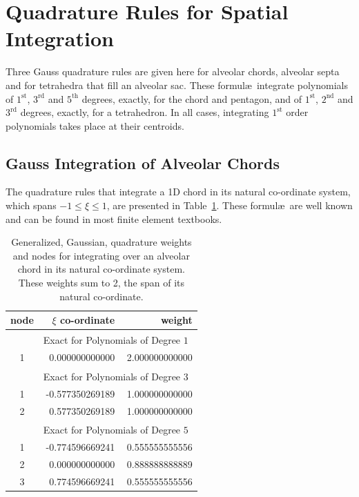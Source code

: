 \section{Quadrature Rules for Spatial Integration}
\label{secGauss}

Three Gauss quadrature rules are given here for alveolar chords, alveolar septa and for tetrahedra that fill an alveolar sac.  These formul\ae\ integrate polynomials of $1^{\text{st}}$, $3^{\text{rd}}$ and $5^{\text{th}}$ degrees, exactly, for the chord and pentagon, and of $1^{\text{st}}$, $2^{\text{nd}}$ and $3^{\text{rd}}$ degrees, exactly, for a tetrahedron.  In all cases, integrating $1^{\text{st}}$ order polynomials takes place at their centroids.

\subsection{Gauss Integration of Alveolar Chords}

The quadrature rules that integrate a 1D chord in its natural co-ordinate system, which spans $-1 \leq \xi \leq 1$, are presented in Table~\ref{tabQuadrature1D}.  These formul\ae\ are well known and can be found in most finite element textbooks.

\begin{table}
    \centering
    \begin{tabular}{|c|rr|}
        \hline
        node & \centering $\xi$ co-ordinate \phantom{1}  & 
        weight \phantom{123} \\ \hline
        & \multicolumn{2}{|c|}{Exact for Polynomials of Degree $1^{\phantom{|^|}}$} \\ 
        \hline
        1 & 0.000000000000 & 2.000000000000 \\ 
        \hline
        & \multicolumn{2}{|c|}{Exact for Polynomials of Degree $3^{\phantom{|^|}}$} \\ \hline
        1 & -0.577350269189 & 1.000000000000\\
        2 & 0.577350269189 & 1.000000000000\\ 
        \hline
        & \multicolumn{2}{|c|}{Exact for Polynomials of Degree $5^{\phantom{|^|}}$} \\ \hline
        1 & -0.774596669241 & 0.555555555556 \\
        2 & 0.000000000000 & 0.888888888889\\
        3 & 0.774596669241 & 0.555555555556\\ 
        \hline
    \end{tabular}
    \caption{Generalized, Gaussian, quadrature weights and nodes for integrating over an alveolar chord in its natural co-ordinate system.  These weights sum to 2, the span of its natural co-ordinate.}
    \label{tabQuadrature1D}
\end{table}

